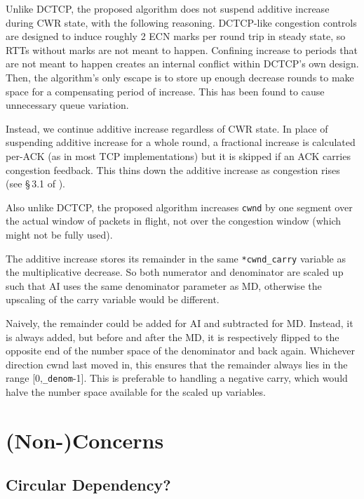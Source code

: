 Unlike DCTCP, the proposed algorithm does not suspend additive increase during
CWR state, with the following reasoning. DCTCP-like congestion controls are
designed to induce roughly 2 ECN marks per round trip in steady state, so RTTs
without marks are not meant to happen. Confining increase to periods that are
not meant to happen creates an internal conflict within DCTCP's own design.
Then, the algorithm's only escape is to store up enough decrease rounds to make
space for a compensating period of increase. This has been found to cause
unnecessary queue variation.

Instead, we continue additive increase regardless of CWR state. In place of
suspending additive increase for a whole round, a fractional increase is
calculated per-ACK (as in most TCP implementations) but it is skipped if an ACK
carries congestion feedback. This thins down the additive increase as congestion
rises (see \S\,3.1 of \cite{Briscoe17a:CC_Tensions_TR}).

Also unlike DCTCP, the proposed algorithm increases \texttt{cwnd} by one segment
over the actual window of packets in flight, not over the congestion window
(which might not be fully used).

The additive increase stores its remainder in the same \texttt{*cwnd\_carry}
variable as the multiplicative decrease. So both numerator and denominator are
scaled up such that AI uses the same denominator parameter as MD, otherwise the
upscaling of the carry variable would be different.

Naively, the remainder could be added for AI and subtracted for MD. Instead, it
is always added, but before and after the MD, it is respectively flipped to the
opposite end of the number space of the denominator and back again. Whichever
direction cwnd last moved in, this ensures that the remainder always lies in the
range [0,\texttt{\_denom}-1]. This is preferable to handling a negative carry,
which would halve the number space available for the scaled up variables.

\section{(Non-)Concerns}\label{prresp_Non-Concerns}

\subsection{Circular Dependency?}\label{prresp_No_Circular_Dependency}

